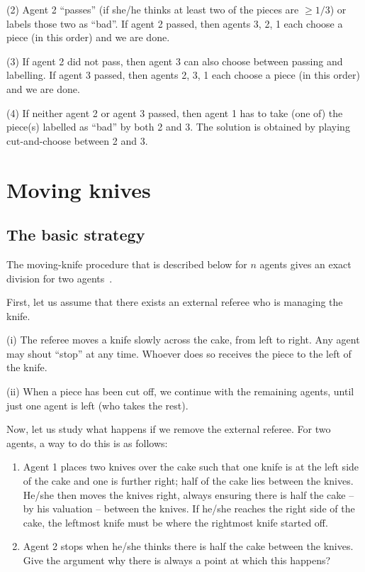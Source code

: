 (2) Agent 2 “passes” (if she/he thinks at least two of the pieces are $\geq 1/3$) or labels those two as “bad”. 
If agent 2 passed, then agents 3, 2, 1 each choose a piece (in this order) and we are done.

(3) If agent 2 did not pass, then agent 3 can also choose between passing and labelling. 
If agent 3 passed, then agents 2, 3, 1 each choose a piece (in this order) and we are done.

(4) If neither agent 2 or agent 3 passed, then agent 1 has to take (one of) the piece(s) labelled as “bad” by both 2 and 3.
The solution is obtained by playing cut-and-choose between 2 and 3.


\section{Moving knives}

\subsection{The basic strategy}

The moving-knife procedure that is described below for $n$ agents gives an exact division for two agents~\cite{Dublins}. 

First, let us assume that there exists an external referee who is managing the knife. 


(i) The referee moves a knife slowly across the cake, from left to right. 
Any agent may shout “stop” at any time. Whoever does so receives the piece to the left of the knife.

(ii) When a piece has been cut off, we continue with the remaining agents, until just one agent is left (who takes the rest).
\bigskip 

Now, let us study what happens if we remove the external referee. 
For two agents, a way to do this is as follows:

\begin{enumerate}
\item 
Agent 1 places two knives over the cake such that one knife is at the left side of the cake and one is further right; 
half of the cake lies between the knives. 
He/she then moves the knives right, always ensuring there is half the cake – by his valuation – between the knives. 
If he/she reaches the right side of the cake, the leftmost knife must be where the rightmost knife started off. 
\item Agent 2 stops when he/she thinks there is half the cake between the knives. 
{\Denis Give the argument why there is always a point at which this happens?}
\end{enumerate}


